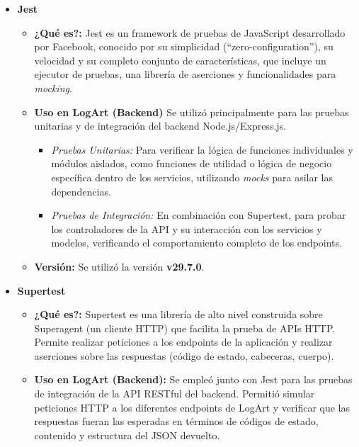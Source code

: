     \begin{itemize}
        \item \textbf{Jest}
            \begin{itemize}
                \item \textbf{¿Qué es?:} Jest es un framework de pruebas de JavaScript desarrollado por Facebook, conocido por su simplicidad (``zero-configuration''), su velocidad y su completo conjunto de características, que incluye un ejecutor de pruebas, una librería de aserciones y funcionalidades para \textit{mocking}. \cite{testimJestIntro}
                \item \textbf{Uso en LogArt (Backend)} Se utilizó principalmente para las pruebas unitarias y de integración del backend Node.js/Express.js. 
                    \begin{itemize}
                        \item \textit{Pruebas Unitarias:} Para verificar la lógica de funciones individuales y módulos aislados, como funciones de utilidad o lógica de negocio específica dentro de los servicios, utilizando \textit{mocks} para asilar las dependencias.
                        \item \textit{Pruebas de Integración:} En combinación con Supertest, para probar los controladores de la API y su interacción con los servicios y modelos, verificando el comportamiento completo de los endpoints.
                    \end{itemize}
                \item \textbf{Versión:} Se utilizó la versión \textbf{v29.7.0}.
            \end{itemize}
        \vspace{0.3cm}
        \item \textbf{Supertest}
            \begin{itemize}
                \item \textbf{¿Qué es?:} Supertest es una librería de alto nivel construida sobre Superagent (un cliente HTTP) que facilita la prueba de APIs HTTP. Permite realizar peticiones a los endpoints de la aplicación y realizar aserciones sobre las respuestas (código de estado, cabeceras, cuerpo). \cite{abidullahSupertest}
                \item \textbf{Uso en LogArt (Backend):} Se empleó junto con Jest para las pruebas de integración de la API RESTful del backend. Permitió simular peticiones HTTP a los diferentes endpoints de LogArt y verificar que las respuestas fueran las esperadas en términos de códigos de estado, contenido y estructura del JSON devuelto.

\end{itemize}
\end{itemize}
